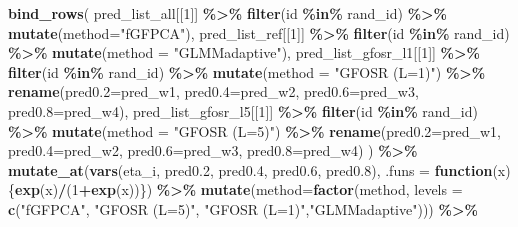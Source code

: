 \documentclass[
]{article}
\newenvironment{Shaded}{\begin{snugshade}}{\end{snugshade}}
\newcommand{\AttributeTok}[1]{\textcolor[rgb]{0.13,0.29,0.53}{#1}}
\newcommand{\ControlFlowTok}[1]{\textcolor[rgb]{0.13,0.29,0.53}{\textbf{#1}}}
\newcommand{\DecValTok}[1]{\textcolor[rgb]{0.00,0.00,0.81}{#1}}
\newcommand{\FloatTok}[1]{\textcolor[rgb]{0.00,0.00,0.81}{#1}}
\newcommand{\FunctionTok}[1]{\textcolor[rgb]{0.13,0.29,0.53}{\textbf{#1}}}
\newcommand{\NormalTok}[1]{#1}
\newcommand{\SpecialCharTok}[1]{\textcolor[rgb]{0.81,0.36,0.00}{\textbf{#1}}}
\newcommand{\StringTok}[1]{\textcolor[rgb]{0.31,0.60,0.02}{#1}}
\begin{document}
\begin{Shaded}
\begin{Highlighting}[]
\FunctionTok{bind\_rows}\NormalTok{(}
\NormalTok{  pred\_list\_all[[}\DecValTok{1}\NormalTok{]] }\SpecialCharTok{\%\textgreater{}\%} \FunctionTok{filter}\NormalTok{(id }\SpecialCharTok{\%in\%}\NormalTok{ rand\_id) }\SpecialCharTok{\%\textgreater{}\%} 
    \FunctionTok{mutate}\NormalTok{(}\AttributeTok{method=}\StringTok{"fGFPCA"}\NormalTok{),}
\NormalTok{  pred\_list\_ref[[}\DecValTok{1}\NormalTok{]] }\SpecialCharTok{\%\textgreater{}\%} \FunctionTok{filter}\NormalTok{(id }\SpecialCharTok{\%in\%}\NormalTok{ rand\_id) }\SpecialCharTok{\%\textgreater{}\%}
    \FunctionTok{mutate}\NormalTok{(}\AttributeTok{method =} \StringTok{"GLMMadaptive"}\NormalTok{),}
\NormalTok{  pred\_list\_gfosr\_l1[[}\DecValTok{1}\NormalTok{]] }\SpecialCharTok{\%\textgreater{}\%} \FunctionTok{filter}\NormalTok{(id }\SpecialCharTok{\%in\%}\NormalTok{ rand\_id) }\SpecialCharTok{\%\textgreater{}\%}
    \FunctionTok{mutate}\NormalTok{(}\AttributeTok{method =} \StringTok{"GFOSR (L=1)"}\NormalTok{) }\SpecialCharTok{\%\textgreater{}\%}
    \FunctionTok{rename}\NormalTok{(}\AttributeTok{pred0.2=}\NormalTok{pred\_w1, }\AttributeTok{pred0.4=}\NormalTok{pred\_w2, }\AttributeTok{pred0.6=}\NormalTok{pred\_w3, }\AttributeTok{pred0.8=}\NormalTok{pred\_w4),}
\NormalTok{  pred\_list\_gfosr\_l5[[}\DecValTok{1}\NormalTok{]] }\SpecialCharTok{\%\textgreater{}\%} \FunctionTok{filter}\NormalTok{(id }\SpecialCharTok{\%in\%}\NormalTok{ rand\_id) }\SpecialCharTok{\%\textgreater{}\%}
    \FunctionTok{mutate}\NormalTok{(}\AttributeTok{method =} \StringTok{"GFOSR (L=5)"}\NormalTok{) }\SpecialCharTok{\%\textgreater{}\%}
    \FunctionTok{rename}\NormalTok{(}\AttributeTok{pred0.2=}\NormalTok{pred\_w1, }\AttributeTok{pred0.4=}\NormalTok{pred\_w2, }\AttributeTok{pred0.6=}\NormalTok{pred\_w3, }\AttributeTok{pred0.8=}\NormalTok{pred\_w4)}
\NormalTok{) }\SpecialCharTok{\%\textgreater{}\%} \FunctionTok{mutate\_at}\NormalTok{(}\FunctionTok{vars}\NormalTok{(eta\_i, pred0}\FloatTok{.2}\NormalTok{, pred0}\FloatTok{.4}\NormalTok{, pred0}\FloatTok{.6}\NormalTok{, pred0}\FloatTok{.8}\NormalTok{), }
                \AttributeTok{.funs =} \ControlFlowTok{function}\NormalTok{(x)\{}\FunctionTok{exp}\NormalTok{(x)}\SpecialCharTok{/}\NormalTok{(}\DecValTok{1}\SpecialCharTok{+}\FunctionTok{exp}\NormalTok{(x))\}) }\SpecialCharTok{\%\textgreater{}\%}
  \FunctionTok{mutate}\NormalTok{(}\AttributeTok{method=}\FunctionTok{factor}\NormalTok{(method, }
         \AttributeTok{levels =} \FunctionTok{c}\NormalTok{(}\StringTok{"fGFPCA"}\NormalTok{, }\StringTok{"GFOSR (L=5)"}\NormalTok{, }\StringTok{"GFOSR (L=1)"}\NormalTok{,}\StringTok{"GLMMadaptive"}\NormalTok{))) }\SpecialCharTok{\%\textgreater{}\%}

\end{Highlighting}
\end{Shaded}
\end{document}

